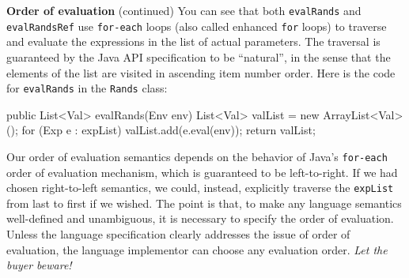 \begin{minipage}[t]{\sw}
\slidenumber
\LARGE
{\bf Order of evaluation} (continued)\exx
You can see that both \verb'evalRands' and \verb'evalRandsRef'
use \verb'for-each' loops (also called enhanced \verb'for' loops)
to traverse and evaluate the expressions in the list of actual parameters.
The traversal is guaranteed by the Java API specification to be ``natural'',
in the sense that the elements of the list
are visited in ascending item number order.
Here is the code for \verb'evalRands' in the \verb'Rands' class:
{\Large
\begin{qv}
public List<Val> evalRands(Env env) {
    List<Val> valList = new ArrayList<Val>();
    for (Exp e : expList)
        valList.add(e.eval(env));
    return valList;
}
\end{qv}
}
Our order of evaluation semantics depends
on the behavior
of Java's \verb'for-each' order of evaluation mechanism,
which is guaranteed to be left-to-right.
If we had chosen right-to-left semantics,
we could, instead, explicitly traverse the \verb'expList'
from last to first if we wished.\exx
The point is that,
to make any language semantics well-defined and unambiguous,
it is necessary to specify the order of evaluation.
Unless the language specification clearly addresses the issue
of order of evaluation, the language implementor can choose
any evaluation order. {\em Let the buyer beware!}
\end{minipage}
\clearpage

